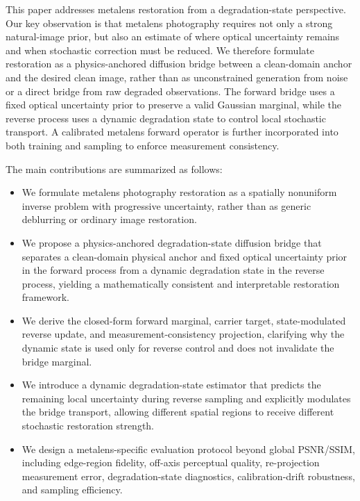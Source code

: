 \documentclass[journal]{IEEEtran}
\begin{document}
This paper addresses metalens restoration from a degradation-state perspective. Our key observation is that metalens photography requires not only a strong natural-image prior, but also an estimate of where optical uncertainty remains and when stochastic correction must be reduced. We therefore formulate restoration as a physics-anchored diffusion bridge between a clean-domain anchor and the desired clean image, rather than as unconstrained generation from noise or a direct bridge from raw degraded observations. The forward bridge uses a fixed optical uncertainty prior to preserve a valid Gaussian marginal, while the reverse process uses a dynamic degradation state to control local stochastic transport. A calibrated metalens forward operator is further incorporated into both training and sampling to enforce measurement consistency.

The main contributions are summarized as follows:
\begin{itemize}
    \item We formulate metalens photography restoration as a spatially nonuniform inverse problem with progressive uncertainty, rather than as generic deblurring or ordinary image restoration.
    \item We propose a physics-anchored degradation-state diffusion bridge that separates a clean-domain physical anchor and fixed optical uncertainty prior in the forward process from a dynamic degradation state in the reverse process, yielding a mathematically consistent and interpretable restoration framework.
    \item We derive the closed-form forward marginal, carrier target, state-modulated reverse update, and measurement-consistency projection, clarifying why the dynamic state is used only for reverse control and does not invalidate the bridge marginal.
    \item We introduce a dynamic degradation-state estimator that predicts the remaining local uncertainty during reverse sampling and explicitly modulates the bridge transport, allowing different spatial regions to receive different stochastic restoration strength.
    \item We design a metalens-specific evaluation protocol beyond global PSNR/SSIM, including edge-region fidelity, off-axis perceptual quality, re-projection measurement error, degradation-state diagnostics, calibration-drift robustness, and sampling efficiency.
\end{itemize}
\end{document}
